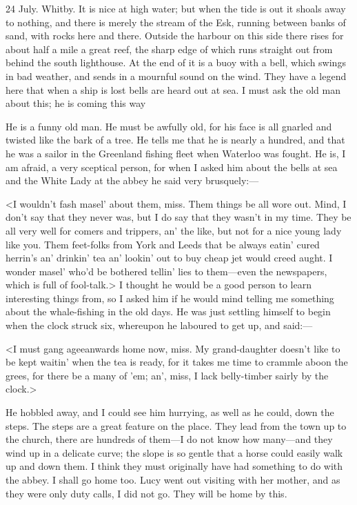 \begin{diary}{24 July. Whitby.}
It is nice at high water; but when the tide is out it shoals away to nothing, and there is merely the stream of the Esk, running between banks of sand, with rocks here and there. Outside the harbour on this side there rises for about half a mile a great reef, the sharp edge of which runs straight out from behind the south lighthouse. At the end of it is a buoy with a bell, which swings in bad weather, and sends in a mournful sound on the wind. They have a legend here that when a ship is lost bells are heard out at sea. I must ask the old man about this; he is coming this way

He is a funny old man. He must be awfully old, for his face is all gnarled and twisted like the bark of a tree. He tells me that he is nearly a hundred, and that he was a sailor in the Greenland fishing fleet when Waterloo was fought. He is, I am afraid, a very sceptical person, for when I asked him about the bells at sea and the White Lady at the abbey he said very brusquely:—

<I wouldn't fash masel' about them, miss. Them things be all wore out. Mind, I don't say that they never was, but I do say that they wasn't in my time. They be all very well for comers and trippers, an' the like, but not for a nice young lady like you. Them feet-folks from York and Leeds that be always eatin' cured herrin's an' drinkin' tea an' lookin' out to buy cheap jet would creed aught. I wonder masel' who'd be bothered tellin' lies to them—even the newspapers, which is full of fool-talk.> I thought he would be a good person to learn interesting things from, so I asked him if he would mind telling me something about the whale-fishing in the old days. He was just settling himself to begin when the clock struck six, whereupon he laboured to get up, and said:—

<I must gang ageeanwards home now, miss. My grand-daughter doesn't like to be kept waitin' when the tea is ready, for it takes me time to crammle aboon the grees, for there be a many of 'em; an', miss, I lack belly-timber sairly by the clock.>

He hobbled away, and I could see him hurrying, as well as he could, down the steps. The steps are a great feature on the place. They lead from the town up to the church, there are hundreds of them—I do not know how many—and they wind up in a delicate curve; the slope is so gentle that a horse could easily walk up and down them. I think they must originally have had something to do with the abbey. I shall go home too. Lucy went out visiting with her mother, and as they were only duty calls, I did not go. They will be home by this.
\end{diary}
 
